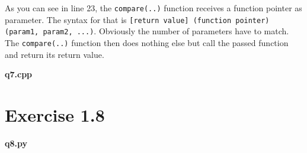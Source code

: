 \documentclass{article} %
\newcommand{\homeworkNumber}{1} %
\begin{document}
As you can see in line 23, the \verb|compare(..)| function receives a function pointer as parameter. The syntax for that is \verb|[return value] (function pointer) (param1, param2, ...)|. Obviously the number of parameters have to match. The \verb|compare(..)| function then does nothing else but call the passed function and return its return value.

\textbf{q7.cpp}
\lstset{language=C++}



\section*{Exercise \homeworkNumber.8}
\textbf{q8.py}
\lstset{language=Python}

\end{document}
